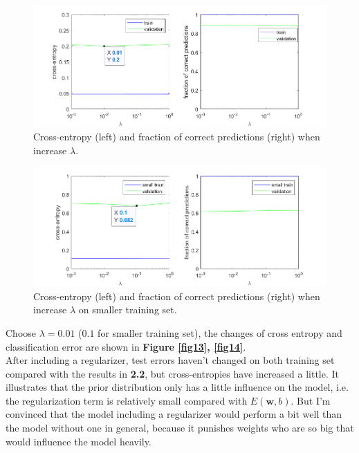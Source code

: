 \documentclass{article}
\begin{document}
\begin{figure}[H]
	\centering
	\includegraphics[scale=0.5]{figure11}
	\caption{Cross-entropy (left) and fraction of correct predictions (right) when increase $\lambda$.}
	\label{fig11}
\end{figure}

\begin{figure}[H]
	\centering
	\includegraphics[scale=0.55]{figure12}
	\caption{Cross-entropy (left) and fraction of correct predictions (right) when increase $\lambda$ on smaller training set.}
	\label{fig12}
\end{figure}

Choose $\lambda=0.01$ ($0.1$ for smaller training set), the changes of cross entropy and classification error are shown in \textbf{Figure \ref{fig13}, \ref{fig14}}.\\

After including a regularizer, test errors haven't changed on both training set compared with the results in \textbf{2.2}, but cross-entropies have increased a little. It illustrates that the prior distribution only has a little influence on the model, i.e. the regularization term is relatively small compared with $E(\bm{w},b)$. But I'm convinced that the model including a regularizer would perform a bit well than the model without one in general, because it punishes weights who are so big that would influence the model heavily.\\
\end{document}
